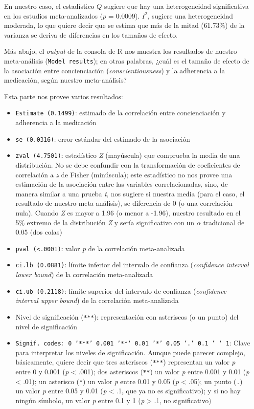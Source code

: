 \documentclass[
  bookmarksnumbered]{article}
\begin{document}
En nuestro caso, el estadístico \(Q\) sugiere que hay una heterogeneidad significativa en los estudios meta-analizados (\(p\) = 0.0009). \(I^2\), sugiere una heterogeneidad moderada, lo que quiere decir que se estima que más de la mitad (61.73\%) de la varianza se deriva de diferencias en los tamaños de efecto.

Más abajo, el \emph{output} de la consola de R nos muestra los resultados de nuestro meta-análisis (\texttt{Model\ results}); en otras palabras, ¿cuál es el tamaño de efecto de la asociación entre concienciación (\emph{conscientiousness}) y la adherencia a la medicación, según nuestro meta-análisis?

Esta parte nos provee varios resultados:

\begin{itemize}
\item
  \texttt{Estimate\ (0.1499)}: estimado de la correlación entre concienciación y adherencia a la medicación
\item
  \texttt{se\ (0.0316)}: error estándar del estimado de la asociación
\item
  \texttt{zval\ (4.7501)}: estadístico \emph{Z} (mayúscula) que comprueba la media de una distribución. No se debe confundir con la transformación de coeficientes de correlación a \emph{z} de Fisher (minúscula); este estadístico no nos provee una estimación de la asociación entre las variables correlacionadas, sino, de manera similar a una prueba \emph{t}, nos sugiere si nuestra media (para el caso, el resultado de nuestro meta-análisis), se diferencia de 0 (o una correlación nula). Cuando \emph{Z} es mayor a 1.96 (o menor a -1.96), nuestro resultado en el 5\% extremo de la distribución \emph{Z} y sería significativo con un \(\alpha\) tradicional de 0.05 (dos colas)
\item
  \texttt{pval\ (\textless{}.0001)}: valor \emph{p} de la correlación meta-analizada
\item
  \texttt{ci.lb\ (0.0881)}: límite inferior del intervalo de confianza (\emph{confidence interval lower bound}) de la correlación meta-analizada
\item
  \texttt{ci.ub\ (0.2118)}: límite superior del intervalo de confianza (\emph{confidence interval upper bound}) de la correlación meta-analizada
\item
  Nivel de significación (\texttt{***}): representación con asteriscos (o un punto) del nivel de significación
\item
  \texttt{Signif.\ codes:\ 0\ ’***’\ 0.001\ ’**’\ 0.01\ ’*’\ 0.05\ ’.’\ 0.1\ ’\ ’\ 1}: Clave para interpretar los niveles de significación. Aunque puede parecer complejo, básicamente, quiere decir que tres asteriscos (\texttt{***}) representan un valor \emph{p} entre 0 y 0.001 (\emph{p} \textless{} .001); dos asteriscos (\texttt{**}) un valor \emph{p} entre 0.001 y 0.01 (\emph{p} \textless{} .01); un asterisco (\texttt{*}) un valor \emph{p} entre 0.01 y 0.05 (\emph{p} \textless{} .05); un punto (\texttt{.}) un valor \emph{p} entre 0.05 y 0.01 (\emph{p} \textless{} .1, que ya no es significativo); y si no hay ningún símbolo, un valor \emph{p} entre 0.1 y 1 (\emph{p} \textgreater{} .1, no significativo)
\end{itemize}
\end{document}
